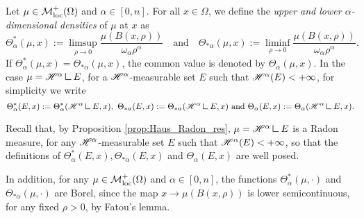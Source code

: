 \begin{definition} \label{def:alpha_dimensional_densities}
Let $\mu \in \mathcal{M}^{+}_{\rm loc}(\Omega)$ and $\alpha \in [0, n]$. For all $x \in \Omega$, we define the {\em upper and lower $\alpha$-dimensional densities} of $\mu$ at $x$ as
\begin{equation*}
\Theta^{*}_{\alpha}(\mu, x) := \limsup_{\rho \to 0} \frac{\mu(B(x, \rho))}{\omega_{\alpha} \rho^{\alpha}} \quad \text{and} \quad \Theta_{* \alpha}(\mu, x) := \liminf_{\rho \to 0} \frac{\mu(B(x, \rho))}{\omega_{\alpha} \rho^{\alpha}}.
\end{equation*}
If $\Theta^{*}_{\alpha}(\mu, x) = \Theta_{* \alpha}(\mu, x)$, the common value is denoted by $\Theta_{\alpha}(\mu, x)$.
In the case $\mu = \Haus{\alpha} \res E$, for a $\mathscr{H}^{\alpha}$-measurable set $E$ such that $\mathscr{H}^{\alpha}(E) < + \infty$, for simplicity we write
\begin{equation*}
\Theta^{*}_{\alpha}(E, x) := \Theta^{*}_{\alpha}(\Haus{\alpha} \res E, x), \ \Theta_{* \alpha}(E, x) := \Theta_{* \alpha}(\Haus{\alpha} \res E, x) \text{ and }  \Theta_{\alpha}(E, x) := \Theta_{\alpha}(\Haus{\alpha} \res E, x).
\end{equation*}
\end{definition}

\begin{remark} \label{rem:Borel_densities}
Recall that, by Proposition \ref{prop:Haus_Radon_res}, $\mu = \Haus{\alpha} \res E$ is a Radon measure, for any $\mathscr{H}^{\alpha}$-measurable set $E$ such that $\mathscr{H}^{\alpha}(E) < + \infty$, so that the definitions of $\Theta^{*}_{\alpha}(E, x), \Theta_{* \alpha}(E, x)$ and $\Theta_{\alpha}(E, x)$ are well posed.

In addition, for any $\mu \in \mathcal{M}^{+}_{\rm loc}(\Omega)$ and $\alpha \in [0, n]$, the functions $\Theta^{*}_{\alpha}(\mu, \cdot)$ and $\Theta_{* \alpha}(\mu, \cdot)$ are Borel, since the map $x \to \mu(B(x, \rho))$ is lower semicontinuous, for any fixed $\rho > 0$, by Fatou's lemma.
\end{remark}

